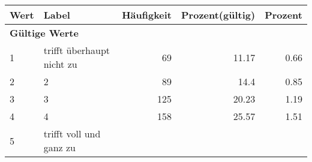      \begin{longtable}{lXrrr}
     \toprule
     \textbf{Wert} & \textbf{Label} & \textbf{Häufigkeit} & \textbf{Prozent(gültig)} & \textbf{Prozent} \\
     \endhead
     \midrule
     \multicolumn{5}{l}{\textbf{Gültige Werte}}\\

     1 &
     \multicolumn{1}{X}{ trifft überhaupt nicht zu   } &


       \num{69} &
       \num[round-mode=places,round-precision=2]{11.17} &
         \num[round-mode=places,round-precision=2]{0.66} \\

     2 &
     \multicolumn{1}{X}{ 2   } &


       \num{89} &
       \num[round-mode=places,round-precision=2]{14.4} &
         \num[round-mode=places,round-precision=2]{0.85} \\

     3 &
     \multicolumn{1}{X}{ 3   } &


       \num{125} &
       \num[round-mode=places,round-precision=2]{20.23} &
         \num[round-mode=places,round-precision=2]{1.19} \\

     4 &
     \multicolumn{1}{X}{ 4   } &


       \num{158} &
       \num[round-mode=places,round-precision=2]{25.57} &
         \num[round-mode=places,round-precision=2]{1.51} \\

     5 &
     \multicolumn{1}{X}{ trifft voll und ganz zu   } &



\end{longtable}
